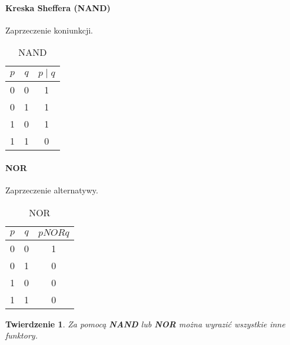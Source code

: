 \documentclass{article}
\newtheorem{theorem}{Twierdzenie}[section]
\begin{document}
    \paragraph{Kreska Sheffera (NAND)}
    Zaprzeczenie koniunkcji.
    \begin{table}[h!]
        \begin{center}
            \caption{NAND}
            \label{tab:tabela6}
            \begin{tabular}{c|c|c}
                \textbf{$p$} & \textbf{$q$} & \textbf{$p \mid q$} \\
                \midrule
                0 & 0 & 1\\
                0 & 1 & 1\\
                1 & 0 & 1\\
                1 & 1 & 0\\
                \bottomrule
            \end{tabular}
        \end{center}
    \end{table}
    \paragraph{NOR}
    Zaprzeczenie alternatywy. 
    \begin{table}[h!]
        \begin{center}
            \caption{NOR}
            \label{tab:tabela7}
            \begin{tabular}{c|c|c}
                \textbf{$p$} & \textbf{$q$} & \textbf{$p NOR q$} \\
                \midrule
                0 & 0 & 1\\
                0 & 1 & 0\\
                1 & 0 & 0\\
                1 & 1 & 0\\
                \bottomrule
            \end{tabular}
        \end{center}
    \end{table}
    \begin{theorem}
        Za pomocą \textbf{NAND} lub \textbf{NOR} można wyrazić wszystkie inne funktory.
    \end{theorem}
\end{document}
